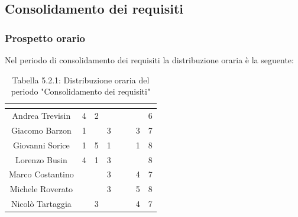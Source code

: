 \subsection{Consolidamento dei requisiti}

\subsubsection{Prospetto orario}
Nel periodo di consolidamento dei requisiti la distribuzione oraria è la seguente:

\renewcommand{\arraystretch}{1.5}
\begin{table}[H]
\begin{center}
\begin{tabular}{|c|c|c|c|c|c|c|c|}
\hline
\rowcolor{title_row}
\textbf{\color{title_text}{Nome}} & \textbf{\color{title_text}{Resp.}} & \textbf{\color{title_text}{Ammi.}} & \textbf{\color{title_text}{Analist.}} & \textbf{\color{title_text}{Progett.}} & \textbf{\color{title_text}{Program.}} & \textbf{\color{title_text}{Verific.}} & \textbf{\color{title_text}{Totale}} \\ \hline
Andrea Trevisin  & 4 & 2 & & & & & 6 \\ \hline
Giacomo Barzon   & 1& & 3 & & & 3 & 7 \\ \hline
Giovanni Sorice  & 1& 5 & 1& & & 1 & 8 \\ \hline
Lorenzo Busin    & 4 & 1 & 3 & & & & 8 \\ \hline
Marco Costantino & & & 3 & & & 4 & 7 \\ \hline
Michele Roverato & & & 3 & & & 5 & 8 \\ \hline
Nicolò Tartaggia & & 3 & & & & 4 & 7 \\ \hline
\end{tabular}
\caption{Tabella 5.2.1: Distribuzione oraria del periodo "Consolidamento dei requisiti"\label{}}
\end{center}
\end{table}
\renewcommand{\arraystretch}{1}

